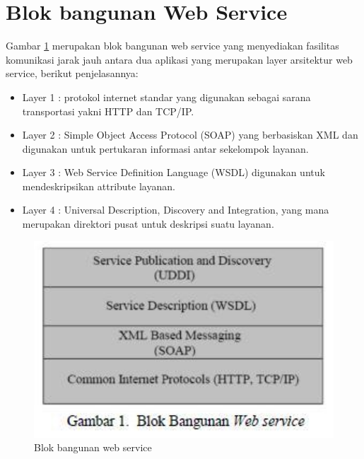 \section{Blok bangunan Web Service}

Gambar \ref{2webservicehttp} merupakan blok bangunan web service yang menyediakan fasilitas komunikasi jarak jauh antara dua aplikasi yang merupakan layer arsitektur web service, berikut penjelasannya:
\begin{itemize}
\item Layer 1 : protokol internet standar yang digunakan sebagai sarana transportasi yakni HTTP dan TCP/IP.
\item Layer 2 : Simple Object Access Protocol (SOAP) yang berbasiskan XML dan digunakan untuk pertukaran informasi antar sekelompok layanan.
\item Layer 3 : Web Service Definition Language (WSDL) digunakan untuk mendeskripsikan attribute layanan.
\item Layer 4 : Universal Description, Discovery and Integration, yang mana merupakan direktori pusat untuk deskripsi suatu layanan\cite{deviana2013penerapan}.
\end{itemize}

\begin{figure}[ht]
\centerline{\includegraphics[width=1\textwidth]{figures/2webservicehttp.jpg}}
\caption{Blok bangunan web service}
\label{2webservicehttp}
\end{figure}

